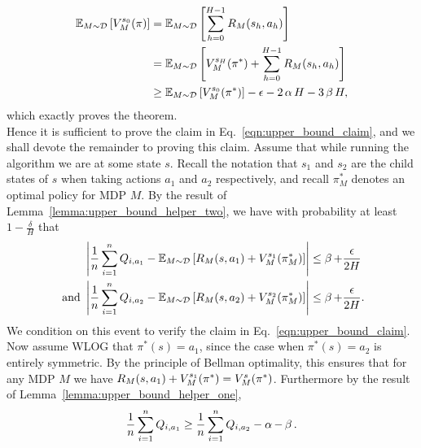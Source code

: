 \documentclass[11pt,twoside]{article}
\begin{document}
\begin{align*}
\operatorname{\mathbb{E}}_{M \sim \mathcal{D}} \left[ V^{{s_0 }}_{{M }}({\pi}) \right] &= \operatorname{\mathbb{E}}_{M \sim \mathcal{D}} \left[ \sum_{h=0}^{H-1} R_M(s_h, a_h) \right] \\
&= \operatorname{\mathbb{E}}_{M \sim \mathcal{D}} \left[ V^{{s_{H} }}_{{M }}({\pi^*}) + \sum_{h=0}^{H-1} R_M(s_h, a_h) \right] \\
&\geq \operatorname{\mathbb{E}}_{M \sim \mathcal{D}} \left[ V^{{s_0 }}_{{M }}({\pi^*}) \right] - \epsilon - 2\operatorname{\alpha} H - 3 \operatorname{\beta} H,
\end{align*}
which exactly proves the theorem. \\

\noindent Hence it is sufficient to prove the claim in Eq.~\eqref{eqn:upper_bound_claim}, and we shall devote the remainder to proving this claim. Assume that while running the algorithm we are at some state $s$. Recall the notation that $s_1$ and $s_2$ are the child states of $s$ when taking actions $a_1$ and $a_2$ respectively, and recall $\pi^*_{M}$ denotes an optimal policy for MDP $M$. By the result of Lemma~\ref{lemma:upper_bound_helper_two}, we have with probability at least $1 - \frac{\delta}{H}$ that
\begin{equation}
\label{eqn:upper_bound_hoeffding}
\begin{split}
&\left \vert \frac{1}{n} \sum_{i=1}^n Q_{i, a_1} - \operatorname{\mathbb{E}}_{M \sim \mathcal{D}} \left[ R_M(s, a_1) + V^{{s_1 }}_{{M }}({\pi^*_M}) \right] \right \vert \leq \operatorname{\beta} + \frac{\epsilon}{2H} \\
\text{ and } &\left \vert \frac{1}{n} \sum_{i=1}^n Q_{i, a_2} - \operatorname{\mathbb{E}}_{M \sim \mathcal{D}} \left[ R_M(s, a_2) + V^{{s_2 }}_{{M }}({\pi^*_M}) \right] \right \vert \leq \operatorname{\beta} + \frac{\epsilon}{2H}.
\end{split}
\end{equation}
We condition on this event to verify the claim in Eq.~\eqref{eqn:upper_bound_claim}. \\

\noindent Now assume WLOG that $\pi^*(s) = a_1$, since the case when $\pi^*(s) = a_2$ is entirely symmetric. By the principle of Bellman optimality, this ensures that for any MDP $M$ we have $R_M(s, a_1) + V^{{s_1 }}_{{M }}({\pi^*}) = V^{{s }}_{{M }}({\pi^*})$. Furthermore by the result of Lemma~\ref{lemma:upper_bound_helper_one},
\begin{equation}
\label{eqn:upper_bound_Q1_lower_bound}
\frac{1}{n} \sum_{i=1}^n Q_{i,a_1} \geq \frac{1}{n} \sum_{i=1}^n Q_{i,a_2} - \operatorname{\alpha} - \operatorname{\beta}.
\end{equation}
\end{document}

